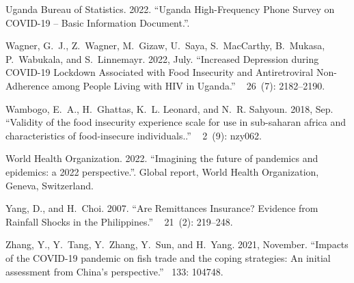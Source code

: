 \documentclass{wber}
\begin{document}
\begin{thebibliography}{}
{Uganda Bureau of Statistics}. 2022.
\newblock ``Uganda {High}-{Frequency} {Phone} {Survey} on {COVID}-19 -- {Basic}
  {Information} {Document}.''.

Wagner, G.~J., Z.~Wagner, M.~Gizaw, U.~Saya, S.~MacCarthy, B.~Mukasa,
  P.~Wabukala, and S.~Linnemayr. 2022, July.
\newblock ``Increased {Depression} during {COVID}-19 {Lockdown} {Associated}
  with {Food} {Insecurity} and {Antiretroviral} {Non}-{Adherence} among
  {People} {Living} with {HIV} in {Uganda}.''
~{ 26\/}~(7): 2182--2190.

Wambogo, E.~A., H.~Ghattas, K.~L. Leonard, and N.~R. Sahyoun. 2018, Sep.
\newblock ``Validity of the food insecurity experience scale for use in
  sub-saharan africa and characteristics of food-insecure individuals..''
~{ 2\/}~(9): nzy062.

{World Health Organization}. 2022.
\newblock ``Imagining the future of pandemics and epidemics: a 2022
  perspective.''.
\newblock Global report, {World Health Organization}, Geneva, Switzerland.

Yang, D., and H.~Choi. 2007.
\newblock ``Are {Remittances} {Insurance}? {Evidence} from {Rainfall} {Shocks}
  in the {Philippines}.''
~{ 21\/}~(2): 219--248.

Zhang, Y., Y.~Tang, Y.~Zhang, Y.~Sun, and H.~Yang. 2021, November.
\newblock ``Impacts of the {COVID}-19 pandemic on fish trade and the coping
  strategies: {An} initial assessment from {China}'s perspective.''
~{133}: 104748.

\end{thebibliography}
\end{document}
